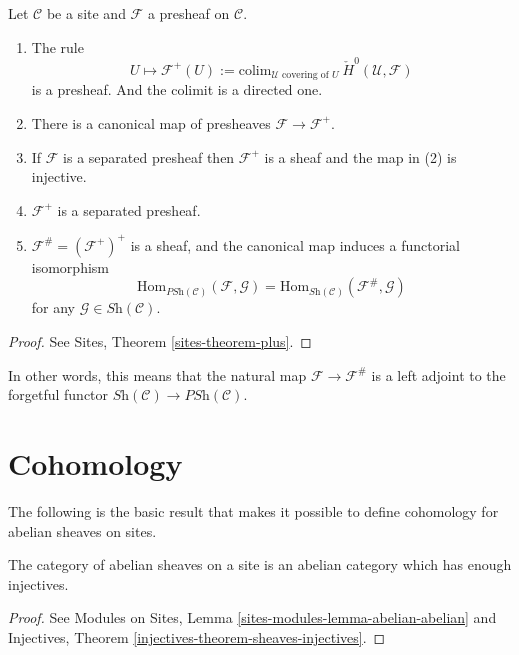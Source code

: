 \begin{theorem}
\label{theorem-sheafification}
Let $\mathcal{C}$ be a site and $\mathcal{F}$ a presheaf on $\mathcal{C}$.
\begin{enumerate}
\item The rule
$$
U \mapsto \mathcal{F}^+(U) :=
\text{colim}_{\mathcal{U} \text{ covering of }U}\ 
\check H^0(\mathcal{U}, \mathcal{F})
$$
is a presheaf. And the colimit is a directed one.
\item There is a canonical map of presheaves $\mathcal{F} \to \mathcal{F}^+$.
\item If $\mathcal{F}$ is a separated presheaf then $\mathcal{F}^+$ is a sheaf
and the map in (2) is injective.
\item $\mathcal{F}^+$ is a separated presheaf.
\item $\mathcal{F}^\# = (\mathcal{F}^+)^+$ is a sheaf, and the canonical
map induces a functorial isomorphism
$$
\text{Hom}_{\textit{PSh}(\mathcal{C})}(\mathcal{F}, \mathcal{G}) =
\text{Hom}_{\textit{Sh}(\mathcal{C})}(\mathcal{F}^\#,\mathcal{G})
$$
for any $\mathcal{G} \in \textit{Sh}(\mathcal{C})$.
\end{enumerate}
\end{theorem}

\begin{proof}
See Sites, Theorem \ref{sites-theorem-plus}.
\end{proof}

\noindent
In other words, this means that the natural map
$\mathcal{F} \to \mathcal{F}^\#$ is a left adjoint to the forgetful functor
$\textit{Sh}(\mathcal{C}) \to \textit{PSh}(\mathcal{C})$.




\section{Cohomology}
\label{section-cohomology}

\noindent
The following is the basic result that makes it possible to define cohomology
for abelian sheaves on sites.

\begin{theorem}
\label{theorem-enough-injectives}
The category of abelian sheaves on a site is an abelian category
which has enough injectives.
\end{theorem}

\begin{proof}
See
Modules on Sites, Lemma \ref{sites-modules-lemma-abelian-abelian} and
Injectives, Theorem \ref{injectives-theorem-sheaves-injectives}.
\end{proof}


